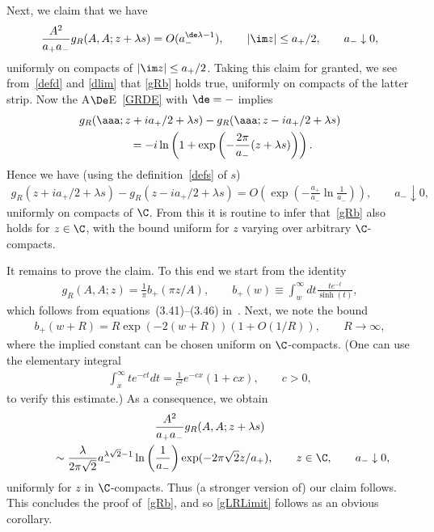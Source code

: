 \documentclass[pdftex]{sigma}
\numberwithin{equation}{section}
\begin{document}
Next, we claim that we have
\begin{gather}\label{gRsp}
\frac{A^2}{a_+a_-}g_R(A,A;z+\lambda s)=O(a_-^{\de\lambda -1}),\qquad |\im z|\le a_+/2,\qquad
 a_-\downarrow 0,
\end{gather}
 uniformly on compacts of $|\im z|\le a_+/2$. Taking this claim for granted, we see from~\eqref{defd} and \eqref{dlim} that \eqref{gRb} holds true, uniformly on compacts of the latter strip. Now the A$\De$E~\eqref{GRDE} with $\de=-$ implies
\begin{gather}
g_R(\aaa; z+ia_+/2 +\lambda s)-g_R(\aaa; z-ia_+/2 +\lambda s)\nonumber\\
\qquad{}=-i\ln \left(1+\exp\left(-\frac{2\pi}{a_-}(z+\lambda s)\right)\right).
\end{gather}
Hence we have (using the def\/inition~\eqref{defs} of $s$)
\begin{gather}
g_R(z+ia_+/2 +\lambda s)-g_R( z-ia_+/2 +\lambda s)=
O\left(\exp\left(-\frac{a_+}{a_-}\ln \frac{1}{a_-}\right)\right),\qquad a_-\downarrow 0,
\end{gather}
uniformly on compacts of $\C$. From this it is routine to infer that~\eqref{gRb} also holds for $z\in\C$, with the bound uniform for $z$ varying over arbitrary $\C$-compacts.

It remains to prove the claim. To this end we start from the identity
\begin{gather}
g_R(A,A;z)=\frac{1}{\pi}b_+(\pi z/A),\qquad b_+(w)\equiv\int_{w}^{\infty}dt \frac{te^{-t}}{\sinh(t)},
\end{gather}
which follows from equations~(3.41)--(3.46) in~\cite{fo}. Next, we note the bound
\begin{gather}
b_+(w+R)=R\exp(-2(w+R))(1+O(1/R)),\qquad R\to\infty,
\end{gather}
where the implied constant can be chosen uniform on $\C$-compacts. (One can use the elementary integral
\begin{gather}
\int_x^{\infty}te^{-ct}dt=\frac{1}{c^2}e^{-cx}(1+cx),\qquad c>0,
\end{gather}
to verify this estimate.) As a consequence, we obtain
\begin{gather}
\frac{A^2}{a_+a_-}g_R(A,A;z+\lambda s)\nonumber\\
\qquad{} \sim \frac{\lambda}{2\pi\sqrt{2}}a_-^{\lambda\sqrt{2}-1}\ln\left(\frac{1}{a_-}\right)\exp(-2\pi\sqrt{2}z/a_+),\qquad z\in\C, \qquad a_-\downarrow 0,
\end{gather}
uniformly for $z$ in $\C$-compacts. Thus (a stronger version of) our claim follows. This concludes the proof of~\eqref{gRb}, and so \eqref{gLRLimit} follows as an obvious corollary.
\end{document}
